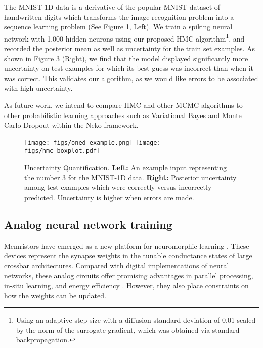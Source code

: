 \documentclass[sigconf,dvipsnames]{acmart}
\begin{document}
The MNIST-1D \cite{greydanus2020scaling} data is a derivative of the popular MNIST dataset of handwritten digits which transforms the image recognition problem into a sequence learning problem (See Figure \ref{fig:hmc}, Left). We train a spiking neural network with 1,000 hidden neurons using our proposed HMC algorithm\footnote{Using an adaptive step size \cite{Andrieu2008Adaptive} with a diffusion standard deviation of 0.01 scaled by the norm of the surrogate gradient, which was obtained via standard backpropagation.}, and recorded the posterior mean as well as uncertainty for the train set examples. As shown in Figure 3 (Right), we find that the model displayed significantly more uncertainty on test examples for which its best guess was incorrect than when it was correct. This validates our algorithm, as we would like errors to be associated with high uncertainty.

As future work, we intend to compare HMC and other MCMC algorithms to other probabilistic learning approaches such as Variational Bayes \cite{Graves2011} and Monte Carlo Dropout \cite{gal2016} within the Neko framework.

\begin{figure}
    \centering
    \texttt{[image: figs/oned\_example.png]}
    \texttt{[image: figs/hmc\_boxplot.pdf]}
    \caption{ Uncertainty Quantification.
    \textmd{\textbf{Left:} An example input representing the number 3 for the MNIST-1D data. \textbf{Right:} Posterior uncertainty among test examples which were correctly versus incorrectly predicted. Uncertainty is higher when errors are made.}}
    \label{fig:hmc}
\end{figure}

\subsection{Analog neural network training}
Memristors have emerged as a new platform for neuromorphic learning \cite{thomas2013memristor,hu2014memristor}.
These devices represent the synapse weights in the tunable conductance states of large crossbar architectures.
Compared with digital implementations of neural networks, these analog circuits offer promising advantages in parallel processing, in-situ learning, and energy efficiency \cite{fuller2019parallel,li2018efficient}.
However, they also place constraints on how the weights can be updated.
\end{document}
